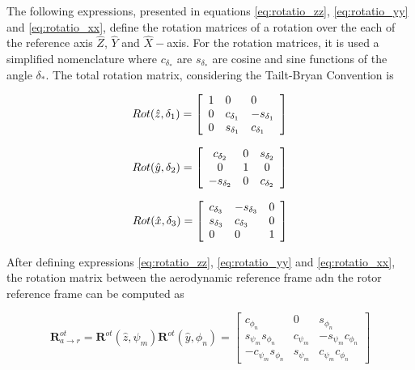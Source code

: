 The following expressions, presented in equations \ref{eq:rotatio_zz}, \ref{eq:rotatio_yy} and \ref{eq:rotatio_xx}, define the rotation matrices of a rotation over the each of the reference axis $\hat{Z}$, $\hat{Y}$ and $\hat{X}-$axis. For the rotation matrices, it is used a simplified nomenclature where $c_{\delta_{*}}$ are $s_{\delta_{*}}$ are cosine and sine functions of the angle $\delta_{*}$. The total rotation matrix, considering the Tailt-Bryan Convention is

\begin{equation}
    {R o t({\hat{z}},\delta_1)}={\left[\begin{array}{l l l}{1}&{0}&{0}\\ {0}&{c_{\delta_1}}&{-s_{\delta_1}}\\ {0}&{s_{\delta_1}}&{c_{\delta_1}}\end{array}\right]}
    \label{eq:rotatio_zz}
\end{equation}

\begin{equation}
    Rot(\hat{y},\delta_2)=\left[\begin{array}{c c c}{{c_{\delta_2}}}&{{0}}&{{s_{\delta_2}}}\\ {{0}}&{{1}}&{{0}}\\ {{-s_{\delta_2}}}&{{0}}&{{c_{\delta_2}}}\end{array}\right]
    \label{eq:rotatio_yy}
\end{equation}

\begin{equation}
    Rot({\hat{x}},{\delta_3})={\left[\begin{array}{l l l}{{{c}_{\delta_3}}}&{{-{s}_{\delta_3}}}&{{0}}\\ {{{s}_{\delta_3}}}&{{{c}_{\delta_3}}}&{{0}}\\ {{0}}&{{0}}&{{1}}\end{array}\right]}
        \label{eq:rotatio_xx} 
\end{equation}


After defining expressions \ref{eq:rotatio_zz}, \ref{eq:rotatio_yy} and \ref{eq:rotatio_xx}, the rotation matrix between the aerodynamic reference frame adn the rotor reference frame can be computed as

\begin{equation}
    \boldsymbol{R}^{ot}_{a \to r} = \boldsymbol{R}^{ot}(\hat{z}, \psi_m) \boldsymbol{R}^{ot}(\hat{y}, \phi_n) =
    \begin{bmatrix}
    c_{\phi_n} & 0 & s_{\phi_n} \\
    s_{\psi_m}s_{\phi_n} & c_{\psi_m} & -s_{\psi_m}c_{\phi_n} \\
    -c_{\psi_m}s_{\phi_n} & s_{\psi_m} & c_{\psi_m}c_{\phi_n}
    \end{bmatrix}    
    \label{eq:rotatio_aero_rotor}
\end{equation}



